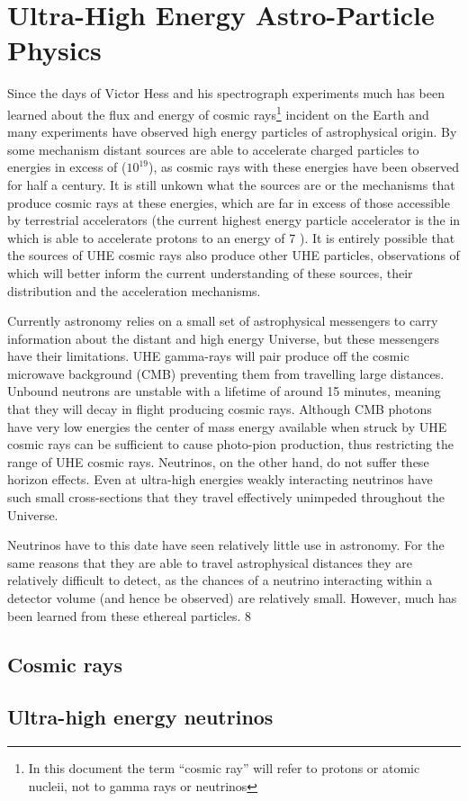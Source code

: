 \chapter{Ultra-High Energy Astro-Particle Physics}
\label{chap:uhe-app}

Since the days of Victor Hess and his spectrograph experiments much has been learned about the flux and energy of cosmic rays\footnote{In this document the term ``cosmic ray'' will refer to protons or atomic nucleii, not to gamma rays or neutrinos} incident on the Earth and many experiments have observed high energy particles of astrophysical origin. By some mechanism distant sources are able to accelerate charged particles to energies in excess of \EeV ($10^{19}$\eV), as cosmic rays with these energies have been observed for half a century. It is still unkown what the sources are or the mechanisms that produce cosmic rays at these energies, which are far in excess of those accessible by terrestrial accelerators (the current highest energy particle accelerator is the \LHC in \CERN which is able to accelerate protons to an energy of 7 \TeV). It is entirely possible that the sources of UHE cosmic rays also produce other UHE particles, observations of which will better inform the current understanding of these sources, their distribution and the acceleration mechanisms.

Currently astronomy relies on a small set of astrophysical messengers to carry information about the distant and high energy Universe, but these messengers have their limitations. UHE gamma-rays 
will pair produce \Pelectron\Ppositron off the cosmic microwave background (CMB) preventing them from travelling large distances. Unbound neutrons are unstable with a lifetime of around 15 minutes, meaning that they will decay in flight producing cosmic rays. Although CMB photons have very low energies the center of mass energy available when struck by UHE cosmic rays can be sufficient to cause photo-pion production, thus restricting the range of UHE cosmic rays. Neutrinos, on the other hand, do not suffer these horizon effects. Even at ultra-high energies weakly interacting neutrinos have such small cross-sections that they travel effectively unimpeded throughout the Universe.

Neutrinos have to this date have seen relatively little use in astronomy. For the same reasons that they are able to travel astrophysical distances they are relatively difficult to detect, as the chances of a neutrino interacting within a detector volume (and hence be observed) are relatively small. However, much has been learned from these ethereal particles. 8








\section{Cosmic rays}

\section{Ultra-high energy neutrinos}
